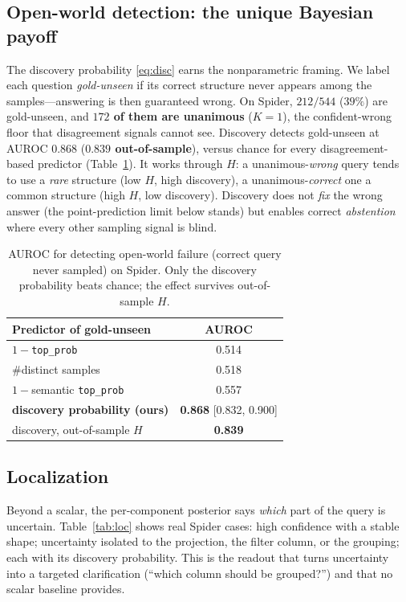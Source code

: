 \documentclass[11pt]{article}
\begin{document}
\subsection{Open-world detection: the unique Bayesian payoff}\label{sec:openworld}
The discovery probability \eqref{eq:disc} earns the nonparametric framing. We label each question
\emph{gold-unseen} if its correct structure never appears among the samples---answering is then
guaranteed wrong. On Spider, $212/544$ ($39\%$) are gold-unseen, and \textbf{$172$ of them are
unanimous} ($K{=}1$), the confident-wrong floor that disagreement signals cannot see. Discovery
detects gold-unseen at AUROC $0.868$ (\textbf{$0.839$ out-of-sample}), versus chance for every
disagreement-based predictor (Table~\ref{tab:open}). It works through $H$: a unanimous-\emph{wrong}
query tends to use a \emph{rare} structure (low $H$, high discovery), a unanimous-\emph{correct} one
a common structure (high $H$, low discovery). Discovery does not \emph{fix} the wrong answer (the
point-prediction limit below stands) but enables correct \emph{abstention} where every other sampling
signal is blind.

\begin{table}[t]
\centering
\caption{AUROC for detecting open-world failure (correct query never sampled) on Spider. Only the
discovery probability beats chance; the effect survives out-of-sample $H$.}
\label{tab:open}
\begin{tabular}{lc}
\toprule
Predictor of gold-unseen & AUROC\\
\midrule
$1-$\texttt{top\_prob} & 0.514\\
\#distinct samples & 0.518\\
$1-$semantic \texttt{top\_prob} & 0.557\\
\textbf{discovery probability (ours)} & \textbf{0.868} {\footnotesize[0.832, 0.900]}\\
\quad discovery, out-of-sample $H$ & \textbf{0.839}\\
\bottomrule
\end{tabular}
\end{table}

\subsection{Localization}
Beyond a scalar, the per-component posterior says \emph{which} part of the query is uncertain.
Table~\ref{tab:loc} shows real Spider cases: high confidence with a stable shape; uncertainty
isolated to the projection, the filter column, or the grouping; each with its discovery probability.
This is the readout that turns uncertainty into a targeted clarification (``which column should be
grouped?'') and that no scalar baseline provides.
\end{document}
